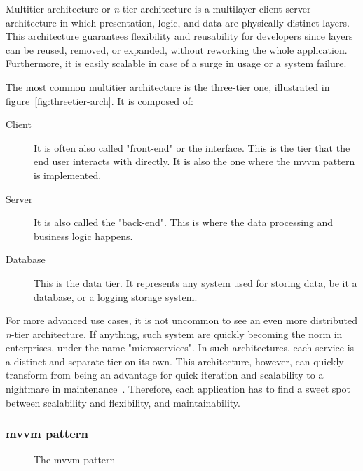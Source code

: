 Multitier architecture or \emph{n}-tier architecture is a multilayer client-server architecture in which presentation, logic, and data are physically distinct layers. This architecture guarantees flexibility and reusability for developers since layers can be reused, removed, or expanded, without reworking the whole application.
Furthermore, it is easily scalable in case of a surge in usage or a system failure.

The most common multitier architecture is the three-tier one, illustrated in figure~\ref{fig:threetier-arch}. It is composed of:
\begin{description}
  \item[Client] It is often also called "front-end" or the interface.
        This is the tier that the end user interacts with directly.
        It is also the one where the \acrshort{mvvm} pattern is implemented.
  \item[Server] It is also called the "back-end".
        This is where the data processing and business logic happens.
  \item[Database] This is the data tier.
        It represents any system used for storing data, be it a database, or a logging storage system.
\end{description}

For more advanced use cases, it is not uncommon to see an even more distributed \emph{n}-tier architecture.
If anything, such system are quickly becoming the norm in enterprises, under the name "microservices".
In such architectures, each service is a distinct and separate tier on its own.
This architecture, however, can quickly transform from being an advantage for quick iteration and scalability to a nightmare in maintenance~\autocite{pautasso_microservices_2017}.
Therefore, each application has to find a sweet spot between scalability and flexibility, and maintainability.

\subsubsection{\acrshort{mvvm} pattern}

\begin{figure}[H]
  \centerfloat
  \sffamily

  \caption{The \acrshort{mvvm} pattern}
  \label{fig:mvvm-arch}
\end{figure}

